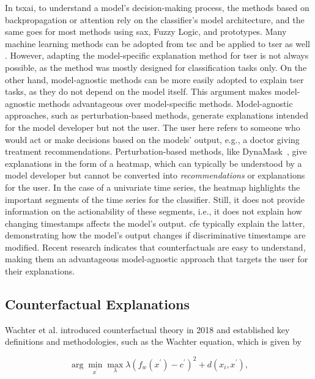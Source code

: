 In \gls{tsxai}, to understand a model's decision-making process, the methods based on backpropagation or attention rely on the classifier's model architecture, and the same goes for most methods using \gls{sax}, Fuzzy Logic, and prototypes. 
Many machine learning methods can be adopted from \gls{tsc} and be applied to \gls{tser} as well \cite{mohammadi_foumani_deep_2024}. However, adapting the model-specific explanation method for \gls{tser} is not always possible, as the method was mostly designed for classification tasks only.
On the other hand, model-agnostic methods can be more easily adopted to explain \gls{tser} tasks, as they do not depend on the model itself. This argument makes model-agnostic methods advantageous over model-specific methods. Model-agnostic approaches, such as perturbation-based methods, generate explanations intended for the model developer but not the user. The user here refers to someone who would act or make decisions based on the models' output, e.g., a doctor giving treatment recommendations. Perturbation-based methods, like DynaMask~\cite{crabbe_explaining_2021}, give explanations in the form of a heatmap, which can typically be understood by a model developer but cannot be converted into \textit{recommendations} or explanations for the user. In the case of a univariate time series, the heatmap highlights the important segments of the time series for the classifier. Still, it does not provide information on the actionability of these segments, i.e., it does not explain how changing timestamps affects the model's output. \gls{cfe} typically explain the latter, demonstrating how the model's output changes if discriminative timestamps are modified. Recent research indicates \cite{miller_explanation_2019} that counterfactuals are easy to understand, making them an advantageous model-agnostic approach that targets the user for their explanations.

\subsection{Counterfactual Explanations}
\label{sec:related-work:counterfactual_explanations}
Wachter et al. \cite{wachter_counterfactual_2018} introduced counterfactual theory in 2018 and established key definitions and methodologies, such as the Wachter equation, which is given by 

\begin{equation} \label{eq:wachter}
\arg \min _{x^{\prime}} \max _{\lambda} \lambda\left(f_{w}\left(x^{\prime}\right)-c^{\prime}\right)^{2}+d\left(x_{i}, x^{\prime}\right),
\end{equation}

